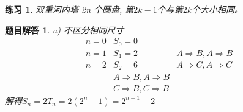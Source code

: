 \documentclass[mode=geye, chinesefont=founder]{elegantnote}
\newtheorem{exercise}{练习}
\newtheorem{answer}{题目解答}
\begin{document}
\begin{exercise}
	双重河内塔 2n 个圆盘, 第$ 2k-1 $个与第$ 2k $个大小相同。
\end{exercise}

\begin{answer}
	a) 不区分相同尺寸
	\begin{equation*}
		\begin{aligned}
			n=0 & S_0=0	& \\
			n=1 & S_1=2	& A \Rightarrow B, A \Rightarrow B\\
			n=2 & S_2=6	& A \Rightarrow C, A \Rightarrow C\\
						& A \Rightarrow B, A \Rightarrow B\\
						& C \Rightarrow B, C \Rightarrow B
		\end{aligned}
	\end{equation*}
	解得$ S_n = 2T_n = 2(2^n-1)=2^{n+1}-2 $
	

\end{answer}
\end{document}
